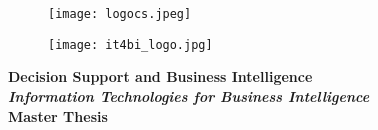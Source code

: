 \begin{titlepage}
\begin{figure}
\vspace{-2cm}
   \begin{minipage}[r]{0.46\linewidth}
   \hspace*{-1cm}
      \texttt{[image: logocs.jpeg]}
   \end{minipage} 
   \begin{minipage}[l]{0.46\linewidth}
   \hspace*{3.7cm}
      \texttt{[image: it4bi\_logo.jpg]}
   \end{minipage}
\end{figure}
\vspace*{0.5cm}
\begin{center}
\noindent \Huge \textbf{Decision Support and Business Intelligence} \\
\vspace*{0.4cm}
\noindent \Large \textit{\textbf{ Information Technologies for Business Intelligence}}\\
\vspace*{0.4cm}
\noindent \Huge \textbf{Master Thesis} \\


\end{center}
\end{titlepage}
